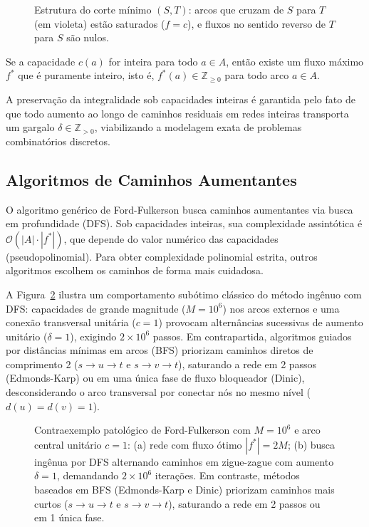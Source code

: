 \begin{figure}[!ht]
\centering

\caption{Estrutura do corte mínimo $(S,T)$: arcos que cruzam de $S$ para $T$ (em violeta) estão saturados ($f = c$), e fluxos no sentido reverso de $T$ para $S$ são nulos.}
\label{fig:corte_minimo}
\end{figure}

\begin{prop}\label{prop:integralidade_rel}
Se a capacidade $c(a)$ for inteira para todo $a \in A$, então existe um fluxo máximo $f^*$ que é puramente inteiro, isto é, $f^*(a) \in \mathbb{Z}_{\ge 0}$ para todo arco $a \in A$.
\end{prop}

A preservação da integralidade sob capacidades inteiras é garantida pelo fato de que todo aumento ao longo de caminhos residuais em redes inteiras transporta um gargalo $\delta \in \mathbb{Z}_{> 0}$, viabilizando a modelagem exata de problemas combinatórios discretos.

\subsection{Algoritmos de Caminhos Aumentantes}

O algoritmo genérico de Ford-Fulkerson busca caminhos aumentantes via busca em profundidade (DFS). Sob capacidades inteiras, sua complexidade assintótica é $\mathcal{O}(|A| \cdot |f^*|)$, que depende do valor numérico das capacidades (pseudopolinomial). Para obter complexidade polinomial estrita, outros algoritmos escolhem os caminhos de forma mais cuidadosa.

A Figura~\ref{fig:ford_fulkerson_patologico} ilustra um comportamento subótimo clássico do método ingênuo com DFS: capacidades de grande magnitude ($M = 10^6$) nos arcos externos e uma conexão transversal unitária ($c=1$) provocam alternâncias sucessivas de aumento unitário ($\delta = 1$), exigindo $2 \times 10^6$ passos. Em contrapartida, algoritmos guiados por distâncias mínimas em arcos (BFS) priorizam caminhos diretos de comprimento 2 ($s \to u \to t$ e $s \to v \to t$), saturando a rede em 2 passos (Edmonds-Karp) ou em uma única fase de fluxo bloqueador (Dinic), desconsiderando o arco transversal por conectar nós no mesmo nível ($d(u) = d(v) = 1$).

\begin{figure}[!ht]
\centering
\resizebox{0.92\textwidth}{!}{%
%
}
\caption{Contraexemplo patológico de Ford-Fulkerson com $M = 10^6$ e arco central unitário $c=1$: (a) rede com fluxo ótimo $|f^*| = 2M$; (b) busca ingênua por DFS alternando caminhos em zigue-zague com aumento $\delta = 1$, demandando $2 \times 10^6$ iterações. Em contraste, métodos baseados em BFS (Edmonds-Karp e Dinic) priorizam caminhos mais curtos ($s \to u \to t$ e $s \to v \to t$), saturando a rede em 2 passos ou em 1 única fase.}
\label{fig:ford_fulkerson_patologico}
\end{figure}

